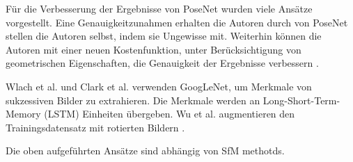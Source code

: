 Für die Verbesserung der Ergebnisse von PoseNet wurden viele Ansätze vorgestellt. Eine Genauigkeitzunahmen erhalten die Autoren durch von PoseNet stellen die Autoren selbst, indem sie Ungewisse mit. Weiterhin können die Autoren mit einer neuen Kostenfunktion, unter Berücksichtigung von geometrischen Eigenschaften, die Genauigkeit der Ergebnisse verbessern \cite{kendallGeometricLossFunctions2017}.

Wlach et al. \cite{walchImagebasedLocalizationUsing2016} und Clark et al. \cite{clarkVidLocDeepSpatioTemporal2017} verwenden GoogLeNet, um Merkmale von sukzessiven Bilder zu extrahieren. Die Merkmale werden an Long-Short-Term-Memory (LSTM) \cite{hochreiterLongShortTermMemory1997a} Einheiten übergeben.
Wu et al. augmentieren den Trainingsdatensatz mit rotierten Bildern \cite{wuDelvingDeeperConvolutional2017}.


Die oben aufgeführten Ansätze sind abhängig von SfM methotds.



% 
